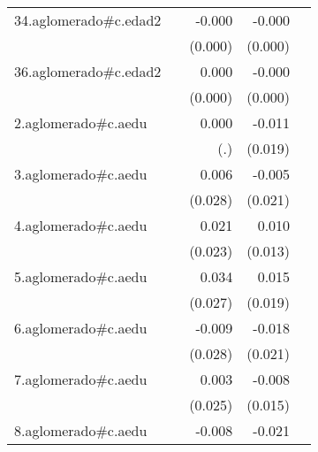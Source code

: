 {\begin{longtable}{l*{4}{D{.}{.}{-1}}}
\addlinespace
34.aglomerado#c.edad2&                     &      -0.000         &      -0.000\sym{***}&                     \\
            &                     &     (0.000)         &     (0.000)         &                     \\
\addlinespace
36.aglomerado#c.edad2&                     &       0.000         &      -0.000         &                     \\
            &                     &     (0.000)         &     (0.000)         &                     \\
\addlinespace
2.aglomerado#c.aedu&                     &       0.000         &      -0.011         &                     \\
            &                     &         (.)         &     (0.019)         &                     \\
\addlinespace
3.aglomerado#c.aedu&                     &       0.006         &      -0.005         &                     \\
            &                     &     (0.028)         &     (0.021)         &                     \\
\addlinespace
4.aglomerado#c.aedu&                     &       0.021         &       0.010         &                     \\
            &                     &     (0.023)         &     (0.013)         &                     \\
\addlinespace
5.aglomerado#c.aedu&                     &       0.034         &       0.015         &                     \\
            &                     &     (0.027)         &     (0.019)         &                     \\
\addlinespace
6.aglomerado#c.aedu&                     &      -0.009         &      -0.018         &                     \\
            &                     &     (0.028)         &     (0.021)         &                     \\
\addlinespace
7.aglomerado#c.aedu&                     &       0.003         &      -0.008         &                     \\
            &                     &     (0.025)         &     (0.015)         &                     \\
\addlinespace
8.aglomerado#c.aedu&                     &      -0.008         &      -0.021         &                     \\

\end{longtable}}
